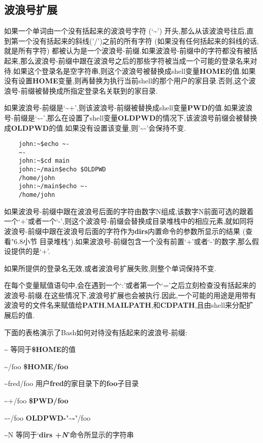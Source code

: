 \documentclass[draft,openany]{book}
\begin{document}
\begin{CJK}{UTF8}{gbsn}
    \subsection{波浪号扩展}
    如果一个单词由一个没有括起来的波浪号字符 (`\~{}') 开头,那么从该波浪号往后,直到第一个没有括起来的斜线('/')之前的所有字符 (如果没有任何括起来的斜线的话,就是所有字符) 都被认为是一个波浪号-前缀.如果波浪号-前缀中的字符都没有被括起来,那么波浪号-前缀中跟在波浪号之后的那些字符被当成一个可能的登录名来对待.如果这个登录名是空字符串,则这个波浪号被替换成shell变量\textbf{HOME}的值.如果没有设置\textbf{HOME}变量,则再替换为执行当前shell的那个用户的家目录.否则,这个波浪号-前缀被替换成所指定登录名关联到的家目录.\par
    如果波浪号-前缀是`\~{}+',则该波浪号-前缀被替换成shell变量\textbf{PWD}的值.如果波浪号-前缀是`\~{}-',那么在设置了shell变量\textbf{OLDPWD}的情况下,该波浪号前缀会被替换成\textbf{OLDPWD}的值.如果没有设置该变量,则'\~{}-'会保持不变.
    \begin{verbatim}
    john:~$echo ~-
    ~-
    john:~$cd main
    john:~/main$echo $OLDPWD
    /home/john
    john:~/main$echo ~-
    /home/john
    \end{verbatim}
    如果波浪号-前缀中跟在波浪号后面的字符由数字N组成,该数字N前面可选的跟着一个`+'或者一个`-',则这个波浪号-前缀会替换成目录堆栈中的相应元素,就如同将波浪号-前缀中跟在波浪号后面的字符作为\textbf{dirs}内置命令的参数所显示的结果 (查看"6.8小节 目录堆栈").如果波浪号-前缀包含一个没有前置`+'或者`-'的数字,那么假设提供的是`+'.\par
    如果所提供的登录名无效,或者波浪号扩展失败,则整个单词保持不变.\par
    在每个变量赋值语句中,会在遇到一个`:'或者第一个`='之后立刻检查没有括起来的波浪号-前缀.在这些情况下,波浪号扩展也会被执行.因此,一个可能的用途是用带有波浪号的文件名来赋值给\textbf{PATH},\textbf{MAILPATH},和\textbf{CDPATH},且由shell来分配扩展后的值.\par
    下面的表格演示了Bash如何对待没有括起来的波浪号-前缀:
    \begin{basedescript}{\desclabelstyle{\nextlinelabel}\desclabelwidth{2.5em}}
    \item[\~{}] 等同于\textbf{\$HOME}的值
    \item[\~{}/foo] \textbf{\$HOME/foo}
    \item[\~{}fred/foo] 用户\textbf{fred}的家目录下的\textbf{foo}子目录
    \item[\~{}+/foo] \textbf{\$PWD/foo}
    \item[\~{}-/foo] \textbf{OLDPWD-'\~{}-'}/foo
    \item[\~{}N] 等同于`\textbf{dirs +\emph{N}}'命令所显示的字符串

\end{basedescript}
\end{CJK}
\end{document}
